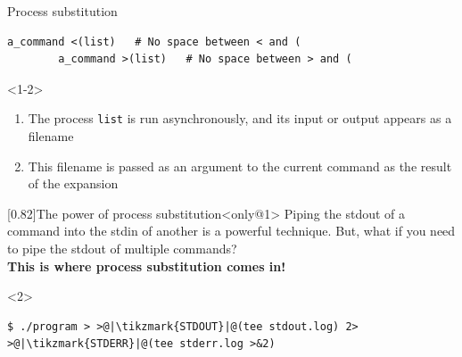 \begin{frame}[fragile]{Process substitution}
    \begin{lstlisting}[style=MyBash, numbers=none, aboveskip=0mm]
        a_command <(list)   # No space between < and (
        a_command >(list)   # No space between > and (
    \end{lstlisting}
    \vspace{3mm}
    \begin{onlyenv}<1-2>
        \begin{enumerate}\small
            \item The process \texttt{list} is run asynchronously, and its input or output appears as a filename
            \item This filename is passed as an argument to the current command as the result of the expansion\\[0.3em]
        \end{enumerate}
        \begin{varblock}{}[0.82\textwidth]{The power of process substitution}<only@1>
            Piping the stdout of a command into the stdin of another is a powerful technique.
            But, what if you need to pipe the stdout of multiple commands?\\
            \textbf{This is where process substitution comes in!}
        \end{varblock}
        \begin{onlyenv}<2>
            \begin{lstlisting}[style=MyBash, numbers=none, aboveskip=3mm]
                $ ./program > >@|\tikzmark{STDOUT}|@(tee stdout.log) 2> >@|\tikzmark{STDERR}|@(tee stderr.log >&2)
            \end{lstlisting}

\end{onlyenv}
\end{onlyenv}
\end{frame}
